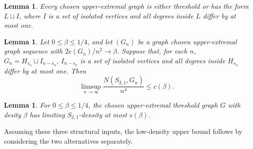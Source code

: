 \documentclass[10pt,a4paper]{article}
\newtheorem{lemma}[definition]{Lemma}
\begin{document}
\begin{lemma}\label{prop:upper-dichotomy}
Every chosen upper-extremal graph is either threshold or has the form $L\sqcup I$, where $I$ is a set of isolated vertices and all degrees inside $L$ differ by at most one.
\end{lemma}

\begin{lemma}\label{lem:upper-core}
Let \(0\le \beta\le 1/4\), and let \((G_n)\) be a graph chosen upper-extremal graph sequence with
$2e(G_n)/n^2\to \beta$.
Suppose that, for each \(n\),
$G_n=H_{s_n}\sqcup I_{n-s_n}$, 
\(I_{n-s_n}\) is a set of isolated vertices and all degrees inside \(H_{s_n}\)
differ by at most one. Then
\[
\limsup_{n\to\infty}\frac{N(S_{2,1},G_n)}{n^4}\le c(\beta).
\]
\end{lemma}

\begin{lemma}\label{lem:upper-threshold-branch}
For $0\le\beta\le1/4$, the chosen upper-extremal threshold graph $G$ with desity $\beta$   has limiting $S_{2,1}$-density at
most $s(\beta)$.
\end{lemma}

Assuming these three structural inputs, the low-density upper bound 
follows by considering the two alternatives separately.
\end{document}

